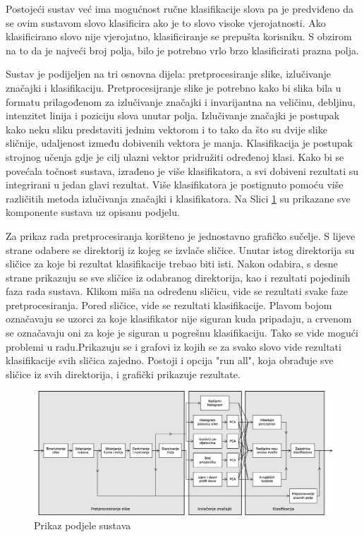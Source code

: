 \documentclass[a4paper,twocolumn,dvipdfm]{article}
\begin{document}
Postojeći sustav već ima mogućnost ručne klasifikacije slova pa je predviđeno
da se ovim sustavom slovo klasificira ako je to slovo visoke vjerojatnosti. Ako
klasificirano slovo nije vjerojatno, klasificiranje se prepušta korisniku. S
obzirom na to da je najveći broj polja, bilo je potrebno vrlo brzo klasificirati
prazna polja.

Sustav je podijeljen na tri osnovna dijela: pretprocesiranje slike, izlučivanje
značajki i klasifikaciju. Pretprocesijranje slike je potrebno kako bi slika bila
u formatu prilagođenom za izlučivanje značajki i invarijantna na veličinu,
debljinu, intenzitet linija i poziciju slova unutar polja. Izlučivanje značajki
je postupak kako neku sliku predstaviti jednim vektorom i to tako da što su
dvije slike sličnije, udaljenost između dobivenih vektora je manja.
Klasifikacija je postupak strojnog učenja gdje je cilj ulazni vektor pridružiti
određenoj klasi. Kako bi se povećala točnost sustava, izrađeno je više
klasifikatora, a svi dobiveni rezultati su integrirani u jedan glavi rezultat.
Više klasifikatora je postignuto pomoću više različitih metoda izlučivanja
značajki i klasifikatora. Na Slici \ref{figure:cijeliSustav} su prikazane sve
komponente sustava uz opisanu podjelu.

Za prikaz rada pretprocesiranja korišteno je jednostavno grafičko sučelje.
S lijeve strane odabere se direktorij iz kojeg se izvlače sličice. Unutar istog
direktorija su sličice za koje bi rezultat klasifikacije trebao biti isti.
Nakon odabira, s desne strane prikazuju se sve sličice iz odabranog direktorija,
kao i rezultati pojedinih faza rada sustava. Klikom miša na određenu sličicu,
vide se rezultati svake faze pretprocesiranja. Pored sličice, vide se rezultati
klasifikacije. Plavom bojom označavaju se uzorci za koje klasifikator nije
siguran kuda pripadaju, a crvenom se označavaju oni za koje je siguran u
pogrešnu klasifikaciju. Tako se vide mogući problemi u radu.Prikazuju se i
grafovi iz kojih se za svako slovo vide rezultati klasifikacije svih sličica
zajedno. Postoji i opcija "run all", koja obrađuje sve sličice iz svih
direktorija, i grafički prikazuje rezultate.


\begin{figure}
\centering
\includegraphics[width=\textwidth]{Diagram1.eps}
\caption{Prikaz podjele sustava}
\label{figure:cijeliSustav}
\end{figure}
\end{document}
